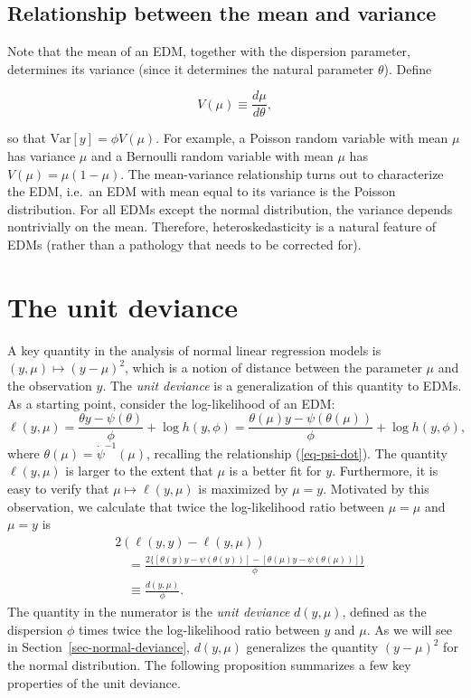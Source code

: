 \documentclass[
  11pt,
  letterpaper,
  oneside]{book}
\theoremstyle{plain}
\theoremstyle{plain}
\theoremstyle{definition}
\theoremstyle{plain}
\theoremstyle{definition}
\theoremstyle{remark}
\begin{document}
\hypertarget{relationship-between-the-mean-and-variance}{%
\subsection{Relationship between the mean and
variance}\label{relationship-between-the-mean-and-variance}}

Note that the mean of an EDM, together with the dispersion parameter,
determines its variance (since it determines the natural parameter
\(\theta\)). Define

\[
V(\mu) \equiv \frac{d\mu}{d\theta},
\]

so that \(\text{Var}[y] = \phi V(\mu)\). For example, a Poisson random
variable with mean \(\mu\) has variance \(\mu\) and a Bernoulli random
variable with mean \(\mu\) has \(V(\mu) = \mu(1-\mu)\). The
mean-variance relationship turns out to characterize the EDM, i.e.~an
EDM with mean equal to its variance is the Poisson distribution. For all
EDMs except the normal distribution, the variance depends nontrivially
on the mean. Therefore, heteroskedasticity is a natural feature of EDMs
(rather than a pathology that needs to be corrected for).

\hypertarget{the-unit-deviance}{%
\section{The unit deviance}\label{the-unit-deviance}}

A key quantity in the analysis of normal linear regression models is
\((y, \mu) \mapsto (y - \mu)^2\), which is a notion of distance between
the parameter \(\mu\) and the observation \(y\). The \emph{unit
deviance} is a generalization of this quantity to EDMs. As a starting
point, consider the log-likelihood of an EDM: \[
\ell(y, \mu) = \frac{\theta y - \psi(\theta)}{\phi} + \log h(y, \phi) = \frac{\theta(\mu) y - \psi(\theta(\mu))}{\phi} + \log h(y, \phi),
\] where \(\theta(\mu) = \dot \psi^{-1}(\mu)\), recalling the
relationship (\ref{eq-psi-dot}). The quantity \(\ell(y, \mu)\) is larger
to the extent that \(\mu\) is a better fit for \(y\). Furthermore, it is
easy to verify that \(\mu \mapsto \ell(y, \mu)\) is maximized by
\(\mu = y\). Motivated by this observation, we calculate that twice the
log-likelihood ratio between \(\mu = \mu\) and \(\mu = y\) is \[
\begin{split}
&2(\ell(y, y) - \ell(y, \mu)) \\
&\quad= \frac{2\{[\theta(y) y - \psi(\theta(y))] - [\theta(\mu) y - \psi(\theta(\mu))]\}}{\phi} \\
&\quad\equiv \frac{d(y, \mu)}{\phi}.
\end{split}
\] The quantity in the numerator is the \emph{unit deviance}
\(d(y, \mu)\), defined as the dispersion \(\phi\) times twice the
log-likelihood ratio between \(y\) and \(\mu\). As we will see in
Section~\ref{sec-normal-deviance}, \(d(y, \mu)\) generalizes the
quantity \((y - \mu)^2\) for the normal distribution. The following
proposition summarizes a few key properties of the unit deviance.
\end{document}
